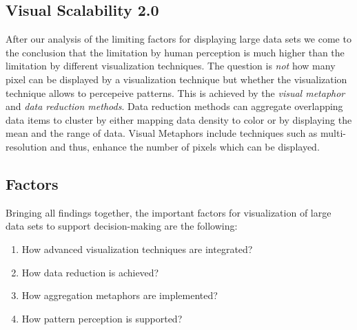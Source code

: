 \subsection{Visual Scalability 2.0}
After our analysis of the limiting factors for displaying large data sets we come to the conclusion that the limitation by human perception is much higher than the limitation by different visualization techniques. The question is \textit{not} how many pixel can be displayed by a visualization technique but whether the visualization technique allows to percepeive patterns. This is achieved by the \textit{visual metaphor} and \textit{data reduction methods}. Data reduction methods can aggregate overlapping data items to cluster by either mapping data density to color or by displaying the mean and the range of data. Visual Metaphors include techniques such as multi-resolution and thus, enhance the number of pixels which can be displayed. 

\subsection{Factors}
Bringing all findings together, the important factors for visualization of large data sets to support decision-making are the following: 
\begin{enumerate}
\item How advanced visualization techniques are integrated?
\item How data reduction is achieved?
\item How aggregation metaphors are implemented?
\item How pattern perception is supported?
\end{enumerate}

